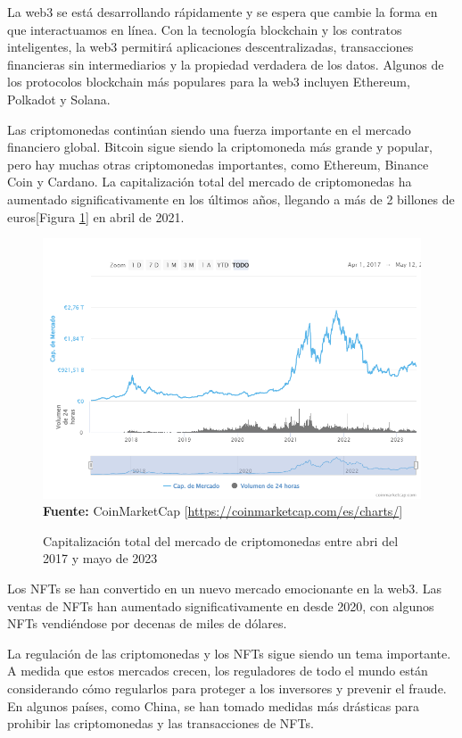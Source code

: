 La web3 se está desarrollando rápidamente y se espera que cambie la forma en
que interactuamos en línea. Con la tecnología blockchain y los contratos
inteligentes, la web3 permitirá aplicaciones descentralizadas, transacciones
financieras sin intermediarios y la propiedad verdadera de los datos. Algunos
de los protocolos blockchain más populares para la web3 incluyen Ethereum,
Polkadot y Solana.

\hfill \break
Las criptomonedas continúan siendo una fuerza importante en el mercado
financiero global. Bitcoin sigue siendo la criptomoneda más grande y popular,
pero hay muchas otras criptomonedas importantes, como Ethereum, Binance Coin y
Cardano. La capitalización total del mercado de criptomonedas ha aumentado
significativamente en los últimos años, llegando a más de 2 billones de
euros[Figura \ref{fig:capit}] en abril de 2021.
\begin{figure}[htb!]
    \centering
    \caption{Capitalización total del mercado de criptomonedas entre abri del 2017 y mayo de 2023}
    \label{fig:capit}
    \centering
    \includegraphics[scale=0.45]{./Ilustraciones/CoinMarketCap chart.png}\\
    \textbf{Fuente:} CoinMarketCap [\url{https://coinmarketcap.com/es/charts/}]
\end{figure}
\hfill \break
Los NFTs se han convertido en un nuevo mercado emocionante en la web3. Las ventas de
NFTs han aumentado significativamente en desde 2020, con algunos NFTs vendiéndose por
decenas de miles de dólares.

\hfill \break
La regulación de las criptomonedas y los NFTs sigue siendo un tema importante.
A medida que estos mercados crecen, los reguladores de todo el mundo están
considerando cómo regularlos para proteger a los inversores y prevenir el
fraude. En algunos países, como China, se han tomado medidas más drásticas para
prohibir las criptomonedas y las transacciones de NFTs.